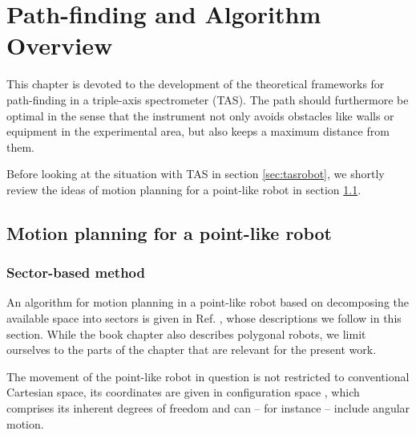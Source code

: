 %
%
\chapter{Path-finding and Algorithm Overview}

This chapter is devoted to the development of the theoretical frameworks for path-finding in a triple-axis spectrometer (TAS). 
The path should furthermore be optimal in the sense that the instrument not only avoids obstacles like walls or equipment in 
the experimental area, but also keeps a maximum distance from them.

Before looking at the situation with TAS in section \ref{sec:tasrobot}, we shortly review the ideas of motion planning for a 
point-like robot in section \ref{sec:pointrobot}.



\section{Motion planning for a point-like robot}
\label{sec:pointrobot}

\subsection*{Sector-based method}
An algorithm for motion planning in a point-like robot based on decomposing the available space into sectors is 
given in Ref. \cite[Ch. 13, pp. 283-306]{Berg2008}, whose descriptions we follow in this section. 
While the book chapter also describes polygonal robots, we limit ourselves to the parts of the chapter 
that are relevant for the present work.

The movement of the point-like robot in question is not restricted to conventional Cartesian space, its coordinates are given in configuration
space  \cite[Ch. 13.1, pp. 284-286]{Berg2008}, which comprises its inherent degrees of freedom and can -- for instance -- include angular motion.


